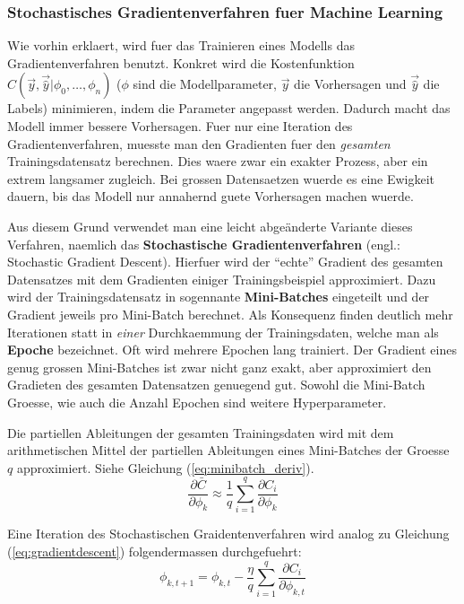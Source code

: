 \documentclass[../main]{subfiles}
\begin{document}
\subsubsection{Stochastisches Gradientenverfahren fuer Machine Learning}
Wie vorhin erklaert, wird fuer das Trainieren eines Modells das Gradientenverfahren benutzt.
Konkret wird die Kostenfunktion $C(\vec{y},\vec{\hat{y}}|\phi_0,\ldots,\phi_n)$
($\phi$ sind die Modellparameter, $\vec{y}$ die Vorhersagen und $\vec{\hat{y}}$
die Labels) minimieren, indem die Parameter angepasst werden. Dadurch macht das Modell immer bessere Vorhersagen.
Fuer nur eine Iteration des Gradientenverfahren, muesste man den Gradienten fuer den
\textit{gesamten} Trainingsdatensatz berechnen.
Dies waere zwar ein exakter Prozess, aber ein extrem langsamer zugleich.
Bei grossen Datensaetzen wuerde es eine Ewigkeit dauern, bis das Modell nur annahernd guete Vorhersagen machen wuerde.
\par\medskip
Aus diesem Grund verwendet man eine leicht abgeänderte Variante dieses Verfahren, naemlich das \textbf{Stochastische Gradientenverfahren} (engl.: Stochastic Gradient Descent).
Hierfuer wird der ``echte'' Gradient des gesamten Datensatzes mit dem Gradienten einiger Trainingsbeispiel approximiert.
Dazu wird der Trainingsdatensatz in sogennante \textbf{Mini-Batches} eingeteilt und der Gradient jeweils pro Mini-Batch berechnet.
Als Konsequenz finden deutlich mehr Iterationen statt in \textit{einer}
Durchkaemmung der Trainingsdaten, welche man als \textbf{Epoche} bezeichnet. Oft wird mehrere Epochen lang trainiert.
Der Gradient eines genug grossen Mini-Batches ist zwar nicht ganz exakt, aber approximiert den Gradieten des gesamten Datensatzen genuegend gut.
Sowohl die Mini-Batch Groesse, wie auch die Anzahl Epochen sind weitere Hyperparameter.
\par\medskip
Die partiellen Ableitungen der gesamten Trainingsdaten wird mit dem arithmetischen Mittel der partiellen Ableitungen eines Mini-Batches der Groesse $q$ approximiert. Siehe Gleichung (\ref{eq:minibatch_deriv}).
\begin{equation}\label{eq:minibatch_deriv}
  \frac{\partial\bar{C}}{\partial\phi_k} \approx \frac{1}{q}\sum_{i=1}^{q} \frac{\partial C_i}{\partial\phi_k}
\end{equation}

Eine Iteration des Stochastischen Graidentenverfahren wird analog zu Gleichung (\ref{eq:gradientdescent}) folgendermassen durchgefuehrt:
\begin{equation}\label{eq:sgd}
  \phi_{k,t+1} = \phi_{k,t} - \frac{\eta}{q} \sum_{i=1}^{q} \frac{\partial C_i}{\partial \phi_{k,t}}
\end{equation}
\end{document}
